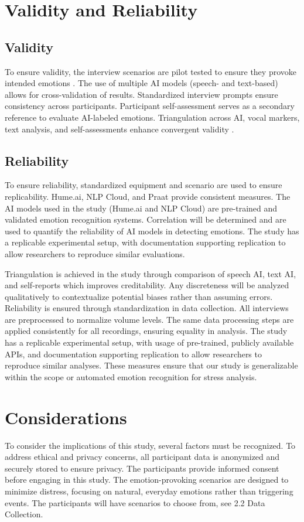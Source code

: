 \section{Validity and Reliability}
\subsection{Validity}
To ensure validity, the interview scenarios are pilot tested to ensure they provoke intended emotions \autocite{Bryman2022}. The use of multiple AI models (speech- and text-based) allows for cross-validation of results. Standardized interview prompts ensure consistency across participants. Participant self-assessment serves as a secondary reference to evaluate AI-labeled emotions. Triangulation across AI, vocal markers, text analysis, and self-assessments enhance convergent validity \autocite{Creswell2023}. 

\subsection{Reliability}
To ensure reliability, standardized equipment and scenario are used to ensure replicability. Hume.ai, NLP Cloud, and Praat provide consistent measures. The AI models used in the study (Hume.ai and NLP Cloud) are pre-trained and validated emotion recognition systems. Correlation will be determined and are used to quantify the reliability of AI models in detecting emotions. The study has a replicable experimental setup, with documentation supporting replication to allow researchers to reproduce similar evaluations.  

Triangulation is achieved in the study through comparison of speech AI, text AI, and self-reports which improves creditability. Any discreteness will be analyzed qualitatively to contextualize potential biases rather than assuming errors. 
Reliability is ensured through standardization in data collection. All interviews are preprocessed to normalize volume levels. 
The same data processing steps are applied consistently for all recordings, ensuring equality in analysis. The study has a replicable experimental setup, with usage of pre-trained, publicly available APIs, and documentation supporting replication to allow researchers to reproduce similar analyses. These measures ensure that our study is generalizable within the scope or automated emotion recognition for stress analysis. 

\section{Considerations}
To consider the implications of this study, several factors must be recognized. To address ethical and privacy concerns, all participant data is anonymized and securely stored to ensure privacy. The participants provide informed consent before engaging in this study. The emotion-provoking scenarios are designed to minimize distress, focusing on natural, everyday emotions rather than triggering events. The participants will have scenarios to choose from, see 2.2 Data Collection. 

